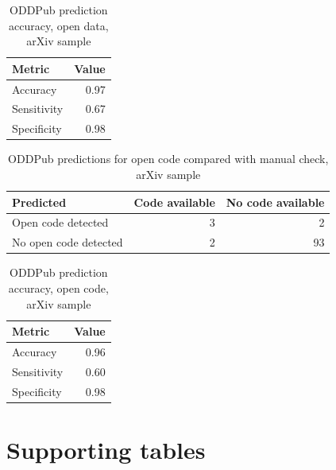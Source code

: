 \documentclass[
]{article}
\begin{document}
\begin{table}[!h]

\caption{\label{tab:arxiv-accuracy-data-2019}ODDPub prediction accuracy, open data, arXiv sample}
\centering
\begin{tabular}[t]{lr}
\toprule
Metric & Value\\
\midrule
Accuracy & 0.97\\
Sensitivity & 0.67\\
Specificity & 0.98\\
\bottomrule
\end{tabular}
\end{table}

\begin{table}[!h]

\caption{\label{tab:arxiv-confusion-code-2019}ODDPub predictions for open code compared with manual check, arXiv sample}
\centering
\begin{tabular}[t]{lrr}
\toprule
Predicted & Code available & No code available\\
\midrule
Open code detected & 3 & 2\\
No open code detected & 2 & 93\\
\bottomrule
\end{tabular}
\end{table}

\begin{table}[!h]

\caption{\label{tab:arxiv-accuracy-code-2019}ODDPub prediction accuracy, open code, arXiv sample}
\centering
\begin{tabular}[t]{lr}
\toprule
Metric & Value\\
\midrule
Accuracy & 0.96\\
Sensitivity & 0.60\\
Specificity & 0.98\\
\bottomrule
\end{tabular}
\end{table}

\newpage

\hypertarget{supporting-tables}{%
\section{Supporting tables}\label{supporting-tables}}
\end{document}
